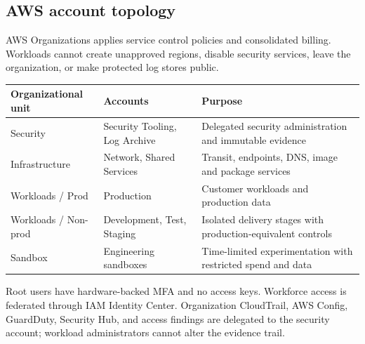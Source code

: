 \subsection{AWS account topology}

AWS Organizations applies service control policies and consolidated billing. Workloads cannot create unapproved regions, disable security services, leave the organization, or make protected log stores public.

\begin{tabularx}{\textwidth}{@{}L{31mm}L{32mm}Y@{}}
  \toprule
  \color{white}\textbf{Organizational unit} & \color{white}\textbf{Accounts} & \color{white}\textbf{Purpose} \\
  \midrule
  Security & Security Tooling, Log Archive & Delegated security administration and immutable evidence \\
  Infrastructure & Network, Shared Services & Transit, endpoints, DNS, image and package services \\
  Workloads / Prod & Production & Customer workloads and production data \\
  Workloads / Non-prod & Development, Test, Staging & Isolated delivery stages with production-equivalent controls \\
  Sandbox & Engineering sandboxes & Time-limited experimentation with restricted spend and data \\
  \bottomrule
\end{tabularx}

\begin{securitybox}
Root users have hardware-backed MFA and no access keys. Workforce access is federated through IAM Identity Center. Organization CloudTrail, AWS Config, GuardDuty, Security Hub, and access findings are delegated to the security account; workload administrators cannot alter the evidence trail.
\end{securitybox}

